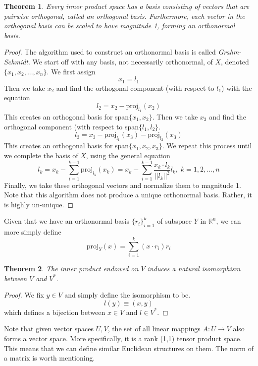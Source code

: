 \documentclass{article}
\newtheorem{theorem}{Theorem}[section]
\theoremstyle{remark}
\theoremstyle{definition}
\begin{document}
\begin{theorem}
Every inner product space has a basis consisting of vectors that are pairwise orthogonal, called an \textit{orthogonal basis}. Furthermore, each vector in the orthogonal basis can be scaled to have magnitude 1, forming an \textit{orthonormal basis}.  
\end{theorem}

\begin{proof}
The algorithm used to construct an orthonormal basis is called \textit{Grahm-Schmidt}. We start off with any basis, not necessarily orthonormal, of $X$, denoted $\{x_1, x_2, ..., x_n\}$. We first assign 
\[x_1 = l_1\]
Then we take $x_2$ and find the orthogonal component (with respect to $l_1$) with the equation
\[l_2 = x_2 - \text{proj}_{l_1} (x_2)\]
This creates an orthogonal basis for span$\{x_1, x_2\}$. Then we take $x_3$ and find the orthogonal component (with respect to span$\{l_1, l_2\}$. 
\[l_3 = x_3 - \text{proj}_{l_1} (x_3) - \text{proj}_{l_2} (x_3)\]
This creates an orthogonal basis for span$\{x_1, x_2, x_3\}$. We repeat this process until we complete the basis of $X$, using the general equation
\[l_k = x_k - \sum_{i=1}^{k-1} \text{proj}_{l_k} (x_k) = x_k - \sum_{i=1}^{k-1} \frac{x_k \cdot l_k}{||l_k||^2} l_k, \; k = 1, 2, ..., n\]
Finally, we take these orthogonal vectors and normalize them to magnitude 1. Note that this algorithm does not produce a unique orthonormal basis. Rather, it is highly un-unique. 
\end{proof}

Given that we have an orthonormal basis $\{r_i\}_{i=1}^k$ of subspace $Y$ in $\mathbb{R}^n$, we can more simply define 
\[ \text{proj}_Y (x) = \sum_{i=1}^k (x \cdot r_i) r_i \]

\begin{theorem}
The inner product endowed on $V$ induces a natural isomorphism between $V$ and $V^*$. 
\end{theorem}
\begin{proof}
We fix $y \in V$ and simply define the isomorphism to be. 
\[ l(y) \equiv (x, y)\]
which defines a bijection between $x \in V$ and $l \in V^*$. 
\end{proof}

Note that given vector spaces $U, V$, the set of all linear mappings $A: U \longrightarrow V$ also forms a vector space. More specifically, it is a rank (1,1) tensor product space. This means that we can define similar Euclidean structures on them. The norm of a matrix is worth mentioning. 
\end{document}
